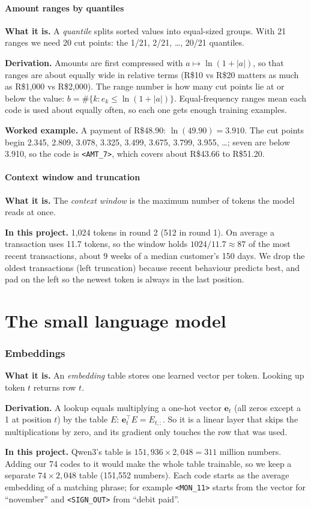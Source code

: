 \documentclass[10pt,a4paper]{article}
\newcommand{\what}[1]{\par\textbf{What it is.} #1}
\newcommand{\here}[1]{\par\textbf{In this project.} #1}
\newcommand{\deriv}{\par\textbf{Derivation.} }
\newcommand{\ex}{\par\textbf{Worked example.} }
\begin{document}
\subsection{Amount ranges by quantiles}\label{sec:bucket}
\what{A \emph{quantile} splits sorted values into equal-sized groups. With 21 ranges we need 20 cut points: the 1/21, 2/21, \ldots, 20/21 quantiles.}
\deriv Amounts are first compressed with $a\mapsto\ln(1+|a|)$, so that ranges are about equally wide in relative terms (R\$10 vs R\$20 matters as much as R\$1,000 vs R\$2,000). The range number is how many cut points lie at or below the value: $b=\#\{k:e_k\le\ln(1+|a|)\}$. Equal-frequency ranges mean each code is used about equally often, so each one gets enough training examples.
\ex A payment of R\$48.90: $\ln(49.90)=3.910$. The cut points begin 2.345, 2.809, 3.078, 3.325, 3.499, 3.675, 3.799, 3.955, \ldots; seven are below 3.910, so the code is \texttt{<AMT\_7>}, which covers about R\$43.66 to R\$51.20.

\subsection{Context window and truncation}
\what{The \emph{context window} is the maximum number of tokens the model reads at once.}
\here{1,024 tokens in round 2 (512 in round 1). On average a transaction uses 11.7 tokens, so the window holds $1024/11.7\approx87$ of the most recent transactions, about 9 weeks of a median customer's 150 days. We drop the oldest transactions (left truncation) because recent behaviour predicts best, and pad on the left so the newest token is always in the last position.}

\part{The small language model}
\section{Embeddings}
\what{An \emph{embedding} table stores one learned vector per token. Looking up token $t$ returns row $t$.}
\deriv A lookup equals multiplying a one-hot vector $\mathbf{e}_t$ (all zeros except a 1 at position $t$) by the table $E$: $\mathbf{e}_t^\top E=E_{t,:}$. So it is a linear layer that skips the multiplications by zero, and its gradient only touches the row that was used.
\here{Qwen3's table is $151{,}936\times2{,}048=311$ million numbers. Adding our 74 codes to it would make the whole table trainable, so we keep a separate $74\times2{,}048$ table (151,552 numbers). Each code starts as the average embedding of a matching phrase; for example \texttt{<MON\_11>} starts from the vector for ``november'' and \texttt{<SIGN\_OUT>} from ``debit paid''.}
\end{document}
